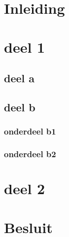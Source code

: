 \section{Inleiding}

\section{deel 1}

\subsection{deel a}

\subsection{deel b}

\subsubsection{onderdeel b1}

\subsubsection{onderdeel b2}

\section{deel 2}

\section{Besluit}